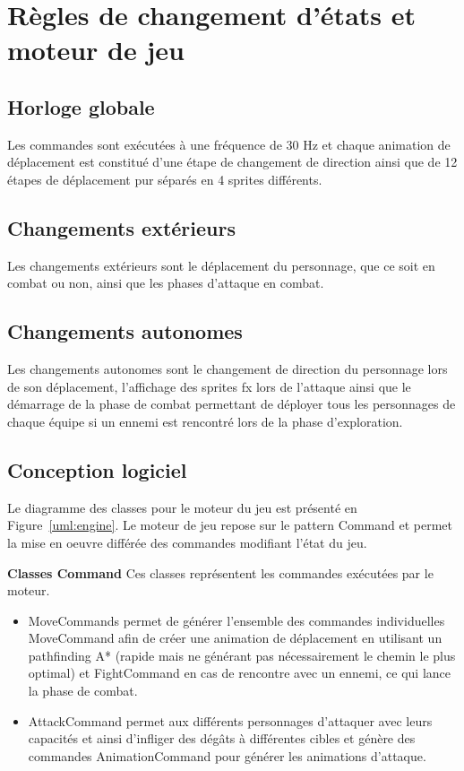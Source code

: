 \documentclass[a4paper,12pt]{article}
\begin{document}
\newpage
\begin{minipage}{\linewidth}

\end{minipage}

\newpage
\section{Règles de changement d'états et moteur de jeu}

\subsection{Horloge globale}
	Les commandes sont exécutées à une fréquence de 30 Hz et chaque animation de déplacement est constitué d'une étape de changement de direction ainsi que de 12 étapes de déplacement pur séparés en 4 sprites différents.


\subsection{Changements extérieurs}
	Les changements extérieurs sont le déplacement du personnage, que ce soit en combat ou non, ainsi que les phases d'attaque en combat.


\subsection{Changements autonomes}
	Les changements autonomes sont le changement de direction du personnage lors de son déplacement, l'affichage des sprites fx lors de l'attaque ainsi que le démarrage de la phase de combat permettant de déployer tous les personnages de chaque équipe si un ennemi est rencontré lors de la phase d'exploration.

\subsection{Conception logiciel}

Le diagramme des classes pour le moteur du jeu est présenté en Figure~\ref{uml:engine}. Le moteur de jeu repose sur le pattern Command et permet la mise en oeuvre différée des commandes modifiant l'état du jeu.

\textbf{Classes Command} Ces classes représentent les commandes exécutées par le moteur. 
\begin{itemize}
\item MoveCommands permet de générer l'ensemble des commandes individuelles MoveCommand afin de créer une animation de déplacement en utilisant un pathfinding A* (rapide mais ne générant pas nécessairement le chemin le plus optimal) et FightCommand en cas de rencontre avec un ennemi, ce qui lance la phase de combat.
\item AttackCommand permet aux différents personnages d'attaquer avec leurs capacités et ainsi d'infliger des dégâts à différentes cibles et génère des commandes AnimationCommand pour générer les animations d'attaque.
\end{itemize}
\end{document}
